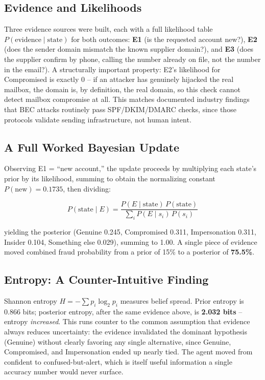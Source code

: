 \documentclass[10pt]{article}
\begin{document}
\subsection{Evidence and Likelihoods}
Three evidence sources were built, each with a full likelihood table
$P(\text{evidence}\mid\text{state})$ for both outcomes:
\textbf{E1} (is the requested account new?), \textbf{E2} (does the
sender domain mismatch the known supplier domain?), and \textbf{E3}
(does the supplier confirm by phone, calling the number already on
file, not the number in the email?). A structurally important
property: E2's likelihood for Compromised is exactly 0 -- if an
attacker has genuinely hijacked the real mailbox, the domain is, by
definition, the real domain, so this check cannot detect mailbox
compromise at all. This matches documented industry findings that BEC
attacks routinely pass SPF/DKIM/DMARC checks, since those protocols
validate sending infrastructure, not human intent.

\subsection{A Full Worked Bayesian Update}
Observing E1 = ``new account,'' the update proceeds by
multiplying each state's prior by its likelihood, summing to obtain
the normalizing constant $P(\text{new}) = 0.1735$, then dividing:

\begin{equation}
P(\text{state}\mid E) = \frac{P(E\mid\text{state})\,P(\text{state})}{\sum_i P(E\mid s_i)\,P(s_i)}
\end{equation}

yielding the posterior (Genuine 0.245, Compromised 0.311,
Impersonation 0.311, Insider 0.104, Something else 0.029), summing to
1.00. A single piece of evidence moved combined fraud probability from
a prior of 15\% to a posterior of \textbf{75.5\%}.

\subsection{Entropy: A Counter-Intuitive Finding}
Shannon entropy $H = -\sum p_i\log_2 p_i$ measures belief spread.
Prior entropy is 0.866 bits; posterior entropy, after the same
evidence above, is \textbf{2.032 bits} -- entropy \emph{increased}.
This runs counter to the common assumption that evidence always
reduces uncertainty: the evidence invalidated the dominant hypothesis
(Genuine) without clearly favoring any single alternative, since
Genuine, Compromised, and Impersonation ended up nearly tied. The
agent moved from confident to confused-but-alert, which is itself
useful information a single accuracy number would never surface.
\end{document}
